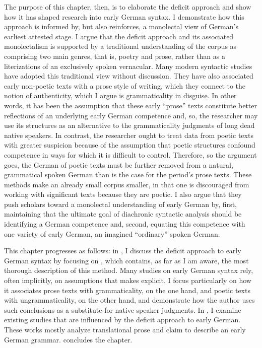 The purpose of this chapter, then, is to elaborate the deficit approach and show how it has shaped research into early German syntax. I demonstrate how this approach is informed by, but also reinforces, a monolectal view of German’s earliest attested stage. I argue that the deficit approach and its associated monolectalism is supported by a traditional understanding of the corpus as comprising two main genres, that is, poetry and prose, rather than as a literizations of an exclusively spoken vernacular. Many modern syntactic studies have adopted this traditional view without discussion. They have also associated early non-poetic texts with a prose style of writing, which they connect to the notion of authenticity, which I argue is grammaticality in disguise. In other words, it has been the assumption that these early “prose” texts constitute better reflections of an underlying early German competence and, so, the researcher may use its structures as an alternative to the grammaticality judgments of long dead native speakers. In contrast, the researcher ought to treat data from poetic texts with greater suspicion because of the assumption that poetic structures confound competence in ways for which it is difficult to control. Therefore, so the argument goes, the German of poetic texts must be further removed from a natural, grammatical spoken German than is the case for the period’s prose texts. These methods make an already small corpus smaller, in that one is discouraged from working with significant texts because they are poetic. I also argue that they push scholars toward a monolectal understanding of early German by, first, maintaining that the ultimate goal of diachronic syntactic analysis should be identifying a German competence and, second, equating this competence with one variety of early German, an imagined “ordinary” spoken German.

This chapter progresses as follows: in , I discuss the deficit approach to early German syntax by focusing on \citet{Fleischer2006}, which contains, as far as I am aware, the most thorough description of this method. Many studies on early German syntax rely, often implicitly, on assumptions that \citet{Fleischer2006} makes explicit. I focus particularly on how it associates prose texts with grammaticality, on the one hand, and poetic texts with ungrammaticality, on the other hand, and demonstrate how the author uses such conclusions as a substitute for native speaker judgments. In , I examine existing studies that are influenced by the deficit approach to early German. These works mostly analyze translational prose and claim to describe an early German grammar.  concludes the chapter.

